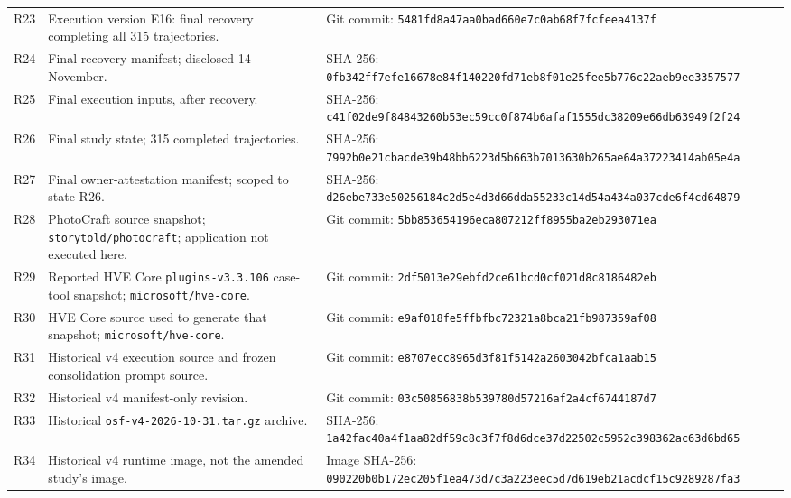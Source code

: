 \documentclass[11pt,a4paper]{article}
\begin{document}
\begin{longtable}{@{}L{0.7cm}L{6.2cm}L{8.1cm}@{}}
\label{prov:R23}R23 & Execution version E16: final recovery completing all 315 trajectories. & Git commit: \nolinkurl{5481fd8a47aa0bad660e7c0ab68f7fcfeea4137f} \\
\label{prov:R24}R24 & Final recovery manifest; disclosed 14 November. & SHA-256: \nolinkurl{0fb342ff7efe16678e84f140220fd71eb8f01e25fee5b776c22aeb9ee3357577} \\
\label{prov:R25}R25 & Final execution inputs, after recovery. & SHA-256: \nolinkurl{c41f02de9f84843260b53ec59cc0f874b6afaf1555dc38209e66db63949f2f24} \\
\label{prov:R26}R26 & Final study state; 315 completed trajectories. & SHA-256: \nolinkurl{7992b0e21cbacde39b48bb6223d5b663b7013630b265ae64a37223414ab05e4a} \\
\label{prov:R27}R27 & Final owner-attestation manifest; scoped to state R26. & SHA-256: \nolinkurl{d26ebe733e50256184c2d5e4d3d66dda55233c14d54a434a037cde6f4cd64879} \\
\label{prov:R28}R28 & PhotoCraft source snapshot; \nolinkurl{storytold/photocraft}; application not executed here. & Git commit: \nolinkurl{5bb853654196eca807212ff8955ba2eb293071ea} \\
\label{prov:R29}R29 & Reported HVE Core \nolinkurl{plugins-v3.3.106} case-tool snapshot; \nolinkurl{microsoft/hve-core}. & Git commit: \nolinkurl{2df5013e29ebfd2ce61bcd0cf021d8c8186482eb} \\
\label{prov:R30}R30 & HVE Core source used to generate that snapshot; \nolinkurl{microsoft/hve-core}. & Git commit: \nolinkurl{e9af018fe5ffbfbc72321a8bca21fb987359af08} \\
\label{prov:R31}R31 & Historical v4 execution source and frozen consolidation prompt source. & Git commit: \nolinkurl{e8707ecc8965d3f81f5142a2603042bfca1aab15} \\
\label{prov:R32}R32 & Historical v4 manifest-only revision. & Git commit: \nolinkurl{03c50856838b539780d57216af2a4cf6744187d7} \\
\label{prov:R33}R33 & Historical \nolinkurl{osf-v4-2026-10-31.tar.gz} archive. & SHA-256: \nolinkurl{1a42fac40a4f1aa82df59c8c3f7f8d6dce37d22502c5952c398362ac63d6bd65} \\
\label{prov:R34}R34 & Historical v4 runtime image, not the amended study's image. & Image SHA-256: \nolinkurl{090220b0b172ec205f1ea473d7c3a223eec5d7d619eb21acdcf15c9289287fa3} \\

\end{longtable}
\end{document}
